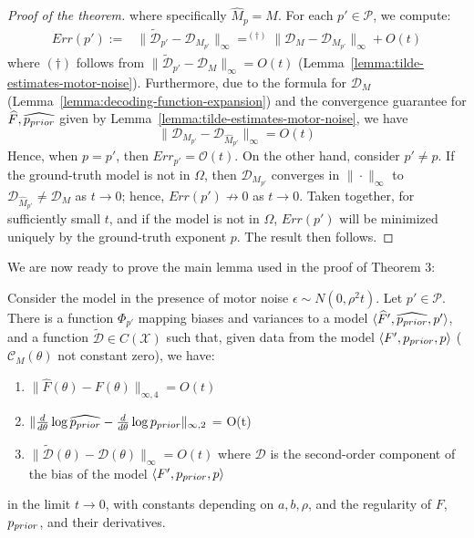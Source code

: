\begin{proof}[Proof of the theorem]
where specifically $\hat{M}_p = M$.
For each $p' \in \mathcal{P}$, we compute:
\begin{align*}
    Err({p'}) := & \|\tilde{\mathcal{D}}_{p'} - \mathcal{D}_{M_{p'}}\|_\infty 
     =^{(\dagger)} \|\mathcal{D}_{M} - \mathcal{D}_{M_{p'}}\|_\infty + O(t)
\end{align*}
where $(\dagger)$ follows from $\|\tilde{\mathcal{D}}_{p'} - \mathcal{D}_M\|_\infty = O(t)$ (Lemma~\ref{lemma:tilde-estimates-motor-noise}).
Furthermore, due to the formula for $\mathcal{D}_M$ (Lemma~\ref{lemma:decoding-function-expansion}) and the convergence guarantee for $\widehat{F}, \widehat{p_{prior}}$ given by Lemma~\ref{lemma:tilde-estimates-motor-noise}, we have
\begin{equation}
    \|\mathcal{D}_{M_{p'}} - \mathcal{D}_{\hat{M}_{p'}}\|_\infty = O(t)
\end{equation}
Hence, when $p=p'$, then $Err_{p'} = \mathcal{O}(t)$.
On the other hand, consider $p'\neq p$.
If the ground-truth model is not in $\Omega$, then $\mathcal{D}_{M_{p'}}$ converges in $\|\cdot\|_\infty$ to $\mathcal{D}_{\hat{M}_{p'}} \neq \mathcal{D}_M$ as $t\rightarrow 0$; hence, $Err({p'}) \not\rightarrow 0$ as $t\rightarrow 0$.
Taken together, for sufficiently small $t$, and if the model is not in $\Omega$, $Err({p'})$ will be minimized uniquely by the ground-truth exponent $p$.
The result then follows.
\end{proof}


We are now ready to prove the main lemma used in the proof of Theorem 3:
\begin{lemma}\label{lemma:tilde-estimates-motor-noise}
Consider the model in the presence of motor noise $\epsilon \sim N(0,\rho^2t)$.
Let $p' \in \mathcal{P}$.
There is a function $\Phi_{p'}$ mapping biases and variances to a model $\langle \widehat{F}', \widehat{p_{prior}}, p'\rangle$, and a function $\tilde{\mathcal{D}} \in C(\mathcal{X})$ such that, given data from the model $\langle F', p_{prior}, p\rangle$ ($\mathcal{C}_M(\theta)$ not constant zero), we have: 
\begin{enumerate}
    \item $\|\widehat{F}(\theta) - F(\theta)\|_{\infty,4} = O(t)$


\item $\|\frac{d}{d\theta}\log\widehat{p_{prior}}-\frac{d}{d\theta}\log p_{prior}\|_{\infty,2}$ = O(t)


    \item $\|\tilde{\mathcal{D}}(\theta) - \mathcal{D}(\theta)\|_\infty = O(t)$ where $\mathcal{D}$ is the second-order component of the bias of the model $\langle F', p_{prior}, p\rangle$
\end{enumerate}
in the limit $t \rightarrow 0$, with constants depending on $a, b, \rho$, and the regularity of $F$, $p_{prior}$, and their derivatives. 


\end{lemma}

